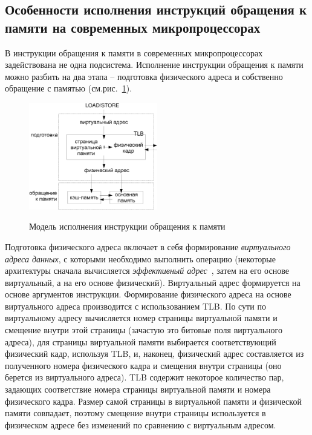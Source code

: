 \subsection{Особенности исполнения инструкций обращения к памяти
на современных микропроцессорах}

В инструкции обращения к памяти в современных микропроцессорах
задействована не одна подсистема. Исполнение инструкции обращения к
памяти можно разбить на два этапа -- подготовка физического адреса и
собственно обращение с памятью (см.рис.~\ref{memoryAccess}).

\begin{figure}[h] \center
  \includegraphics[width=0.5\textwidth]{2.theor/instr}\\
  \caption{Модель исполнения инструкции обращения к памяти}\label{memoryAccess}
\end{figure}

Подготовка физического адреса включает в себя формирование
\emph{виртуального адреса данных}, с которыми необходимо выполнить
операцию (некоторые архитектуры сначала вычисляется
\emph{эффективный адрес}~\cite{PowerPC750}, затем на его основе
виртуальный, а на его основе физический). Виртуальный адрес
формируется на основе аргументов инструкции. Формирование
физического адреса на основе виртуального адреса производится с
использованием TLB. По сути по виртуальному адресу вычисляется номер
страницы виртуальной памяти и смещение внутри этой страницы
(зачастую это битовые поля виртуального адреса), для страницы
виртуальной памяти выбирается соответствующий физический кадр,
используя TLB, и, наконец, физический адрес составляется из
полученного номера физического кадра и смещения внутри страницы (оно
берется из виртуального адреса). TLB содержит некоторое количество
пар, задающих соответствие номера страницы виртуальной памяти и
номера физического кадра. Размер самой страницы в виртуальной памяти
и физической памяти совпадает, поэтому смещение внутри страницы
используется в физическом адресе без изменений по сравнению с
виртуальным адресом.

